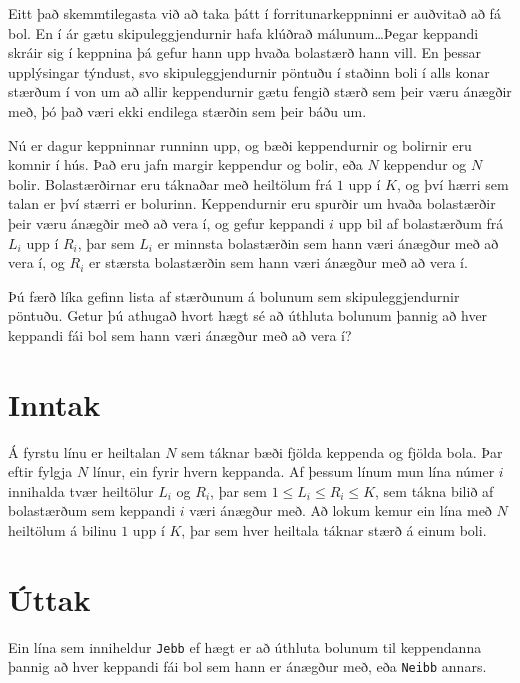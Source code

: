 

Eitt það skemmtilegasta við að taka þátt í forritunarkeppninni er auðvitað að fá bol. En í ár gætu skipuleggjendurnir hafa klúðrað málunum\ldots Þegar keppandi skráir sig í keppnina þá gefur hann upp hvaða bolastærð hann vill. En þessar upplýsingar týndust, svo skipuleggjendurnir pöntuðu í staðinn boli í alls konar stærðum í von um að allir keppendurnir gætu fengið stærð sem þeir væru ánægðir með, þó það væri ekki endilega stærðin sem þeir báðu um.

Nú er dagur keppninnar runninn upp, og bæði keppendurnir og bolirnir eru komnir í hús. Það eru jafn margir keppendur og bolir, eða $N$ keppendur og $N$ bolir. Bolastærðirnar eru táknaðar með heiltölum frá $1$ upp í $K$, og því hærri sem talan er því stærri er bolurinn. Keppendurnir eru spurðir um hvaða bolastærðir þeir væru ánægðir með að vera í, og gefur keppandi $i$ upp bil af bolastærðum frá $L_i$ upp í $R_i$, þar sem $L_i$ er minnsta bolastærðin sem hann væri ánægður með að vera í, og $R_i$ er stærsta bolastærðin sem hann væri ánægður með að vera í.

Þú færð líka gefinn lista af stærðunum á bolunum sem skipuleggjendurnir pöntuðu. Getur þú athugað hvort hægt sé að úthluta bolunum þannig að hver keppandi fái bol sem hann væri ánægður með að vera í?

\section*{Inntak}
Á fyrstu línu er heiltalan $N$ sem táknar bæði fjölda keppenda og fjölda bola. Þar eftir fylgja $N$ línur, ein fyrir hvern keppanda. Af þessum línum mun lína númer $i$ innihalda tvær heiltölur $L_i$ og $R_i$, þar sem $1 \leq L_i \leq R_i \leq K$, sem tákna bilið af bolastærðum sem keppandi $i$ væri ánægður með. Að lokum kemur ein lína með $N$ heiltölum á bilinu $1$ upp í $K$, þar sem hver heiltala táknar stærð á einum boli.

\section*{Úttak}
Ein lína sem inniheldur \texttt{Jebb} ef hægt er að úthluta bolunum til keppendanna þannig að hver keppandi fái bol sem hann er ánægður með, eða \texttt{Neibb} annars.

